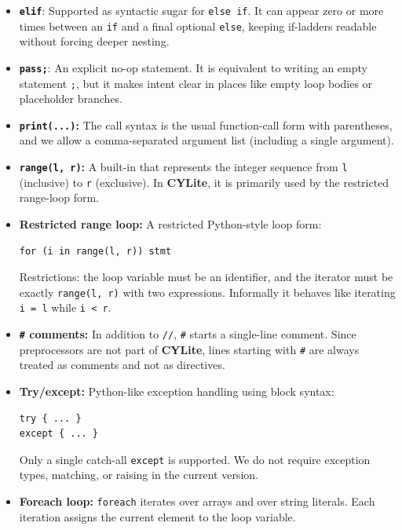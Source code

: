 \documentclass[11pt]{article}
\newcommand{\lang}{\textbf{CYLite}}
\begin{document}
\begin{itemize}
	\item \textbf{\texttt{elif}}: Supported as syntactic sugar for \texttt{else if}. It can appear zero or more times between an \texttt{if} and a final optional \texttt{else}, keeping if-ladders readable without forcing deeper nesting.

	\item \textbf{\texttt{pass;}}: An explicit no-op statement. It is equivalent to writing an empty statement \texttt{;}, but it makes intent clear in places like empty loop bodies or placeholder branches.

	\item \textbf{\texttt{print(...)}:} The call syntax is the usual function-call form with parentheses, and we allow a comma-separated argument list (including a single argument).

	\item \textbf{\texttt{range(l, r)}:} A built-in that represents the integer sequence from \texttt{l} (inclusive) to \texttt{r} (exclusive). In \lang{}, it is primarily used by the restricted range-loop form.

	\item \textbf{Restricted range loop:} A restricted Python-style loop form:
	\begin{lstlisting}
for (i in range(l, r)) stmt
	\end{lstlisting}
	Restrictions: the loop variable must be an identifier, and the iterator must be exactly \texttt{range(l, r)} with two expressions. Informally it behaves like iterating \texttt{i = l} while \texttt{i < r}.

	\item \textbf{\texttt{\#} comments:} In addition to \texttt{//}, \texttt{\#} starts a single-line comment. Since preprocessors are not part of \lang{}, lines starting with \texttt{\#} are always treated as comments and not as directives.

	\item \textbf{Try/except:} Python-like exception handling using block syntax:
	\begin{lstlisting}
try { ... } 
except { ... }
	\end{lstlisting}
	Only a single catch-all \texttt{except} is supported. We do not require exception types, matching, or raising in the current version.

	\item \textbf{Foreach loop:} \texttt{foreach} iterates over arrays and over string literals. Each iteration assigns the current element to the loop variable.


\end{itemize}
\end{document}

